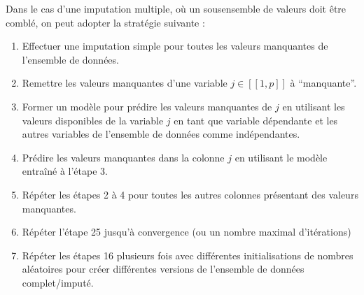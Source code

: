 \documentclass[letterpaper,10pt,english]{jupyterBook}
\begin{document}
\sphinxAtStartPar
Dans le cas d’une imputation multiple, où un sous\sphinxhyphen{}ensemble de valeurs doit être comblé, on peut adopter la stratégie suivante :
\begin{enumerate}
%
\item {} 
\sphinxAtStartPar
Effectuer une imputation simple pour toutes les valeurs manquantes de l’ensemble de données.

\item {} 
\sphinxAtStartPar
Remettre les valeurs manquantes d’une variable \(j\in[\![1,p]\!]\) à “manquante”.

\item {} 
\sphinxAtStartPar
Former un modèle pour prédire les valeurs manquantes de \(j\) en utilisant les valeurs disponibles de la variable \(j\) en tant que variable dépendante et les autres variables de l’ensemble de données comme indépendantes.

\item {} 
\sphinxAtStartPar
Prédire les valeurs manquantes dans la colonne \(j\) en utilisant le modèle entraîné à l’étape 3.

\item {} 
\sphinxAtStartPar
Répéter les étapes 2 à 4 pour toutes les autres colonnes présentant des valeurs manquantes.

\item {} 
\sphinxAtStartPar
Répéter l’étape 2\sphinxhyphen{}5 jusqu’à convergence (ou un nombre maximal d’itérations)

\item {} 
\sphinxAtStartPar
Répéter les étapes 1\sphinxhyphen{}6 plusieurs fois avec différentes initialisations de nombres aléatoires pour créer différentes versions de l’ensemble de données complet/imputé.

\end{enumerate}
\end{document}
